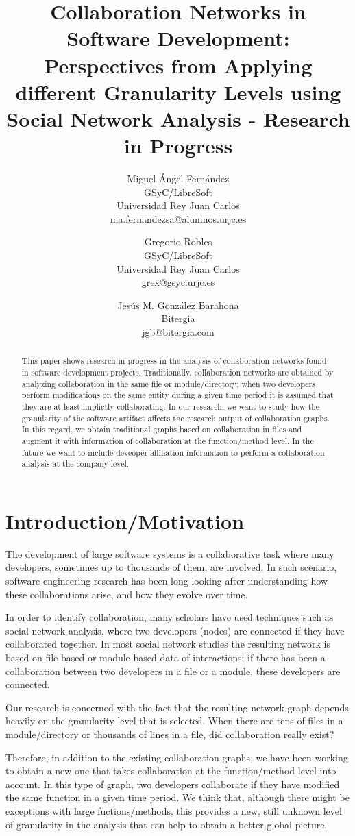 \documentclass[a4paper]{article}
\title{Collaboration Networks in Software Development: Perspectives from Applying different Granularity Levels using Social Network Analysis - Research in Progress}
\author{
Miguel Ángel Fernández \\ GSyC/LibreSoft \\
                Universidad Rey Juan Carlos \\ ma.fernandezsa@alumnos.urjc.es
\and
Gregorio Robles \\ GSyC/LibreSoft \\
                Universidad Rey Juan Carlos \\ grex@gsyc.urjc.es
\and
Jesús M. González Barahona \\ Bitergia \\
                jgb@bitergia.com
}
\begin{document}
\maketitle

\begin{abstract}
This paper shows research in progress in the analysis of collaboration networks
found in software development projects. Traditionally, collaboration networks
are obtained by analyzing collaboration in the same file or module/directory;
when two developers perform modifications on the same entity during a given time
period it is assumed that they are at least implictly collaborating. In our 
research, we want to study how the granularity of the software artifact affects
the research output of collaboration graphs. In this regard, we obtain traditional
graphs based on collaboration in files and augment it with information of
collaboration at the function/method level. In the future we want to include
deveoper affiliation information to perform a collaboration analysis at the
company level.
\end{abstract}
\vskip 32pt


\section{Introduction/Motivation}

The development of large software systems is a collaborative task where
many developers, sometimes up to thousands of them, are involved. In such 
scenario, software engineering research has been long looking after
understanding how these collaborations arise, and how they evolve over time.

In order to identify collaboration, many scholars have used techniques such as
social network analysis, where two developers (nodes) are connected if they
have collaborated together. In most social network studies the
resulting network is based on file-based or module-based data of interactions;
if there has been a collaboration between two developers in a file or a module,
these developers are connected.

Our research is concerned with the fact that the resulting network graph depends
heavily on the granularity level that is selected. When there are tens of files
in a module/directory or thousands of lines in a file, did collaboration really
exist?

Therefore, in addition to the existing collaboration graphs, we have been working
to obtain a new one that takes collaboration at the function/method level into
account. In this type of graph, two developers collaborate if they have modified
the same function in a given time period. We think that, although there might
be exceptions with large fuctions/methods, this provides a new, still unknown
level of granularity in the analysis that can help to obtain a better global 
picture.
\end{document}
